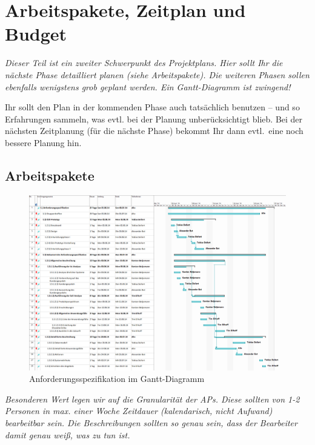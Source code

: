 \documentclass[fontsize=12pt,paper=a4,twoside]{scrartcl}
\begin{document}
\section{Arbeitspakete, Zeitplan und Budget} 
\label{sec:arbeitspaket_zeitplan_budegt}

{\em Dieser Teil ist ein zweiter Schwerpunkt des Projektplans. Hier sollt Ihr die nächste Phase detailliert planen (siehe Arbeitspakete). Die weiteren Phasen sollen ebenfalls wenigstens grob geplant werden. Ein Gantt-Diagramm ist zwingend! 
	
	Ihr sollt den Plan in der kommenden Phase auch tatsächlich benutzen -- und so
	Erfahrungen sammeln, was evtl. bei der Planung unberücksichtigt
	blieb. Bei der nächsten Zeitplanung (für die nächste Phase) bekommt
	Ihr dann evtl.\ eine noch bessere Planung hin.}

\subsection{Arbeitspakete}\label{aps}
\begin{figure}
	\includegraphics[angle = 90, scale=0.5]{as.png}
	\caption{Anforderungsspezifikation im Gantt-Diagramm}
	\label{Gantt-AS}
\end{figure}

{\em Besonderen Wert legen wir auf die Granularität der APs. Diese
	sollten von 1-2 Personen in max. einer Woche Zeitdauer (kalendarisch, nicht
	Aufwand) bearbeitbar sein. Die Beschreibungen sollten so genau sein,
	dass der Bearbeiter damit genau weiß, was zu tun ist.}
\end{document}
